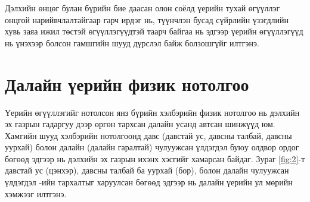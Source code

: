 \documentclass[10pt,twocolumn,letterpaper]{article}
\begin{document}
Дэлхийн өнцөг булан бүрийн бие даасан олон соёлд үерийн тухай өгүүллэг онцгой нарийвчлалтайгаар гарч ирдэг нь, түүнчлэн бусад сүйрлийн үзэгдлийн хувь заяа ижил төстэй өгүүллэгүүдтэй таарч байгаа нь эдгээр үерийн өгүүллэгүүд нь үнэхээр болсон гамшгийн шууд дүрслэл байж болзошгүйг илтгэнэ.

\section{Далайн үерийн физик нотолгоо}

Үерийн өгүүллэгийг нотолсон янз бүрийн хэлбэрийн физик нотолгоо нь дэлхийн эх газрын гадаргуу дээр өргөн тархсан далайн усанд автсан шинжүүд юм. Хамгийн шууд хэлбэрийн нотолгоонд давс (давстай ус, давсны талбай, давсны уурхай) болон далайн (далайн гаралтай) чулуужсан үлдэгдэл буюу олдвор ордог бөгөөд эдгээр нь дэлхийн эх газрын ихэнх хэсгийг хамарсан байдаг. Зураг \ref{fig:2}-т давстай ус (цэнхэр), давсны талбай ба уурхай (бор), болон далайн чулуужсан үлдэгдэл \cite{15,16,86,87}-ийн тархалтыг харуулсан бөгөөд эдгээр нь далайн үерийн ул мөрийн хэмжээг илтгэнэ.
\end{document}
